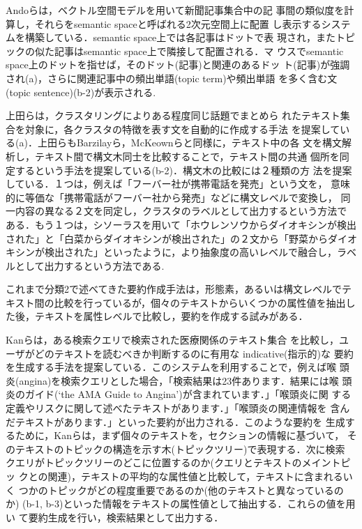 Andoら\cite{ando:00:a}は，ベクトル空間モデルを用いて新聞記事集合中の記
事間の類似度を計算し，それらをsemantic spaceと呼ばれる2次元空間上に配置
し表示するシステムを構築している．semantic space上では各記事はドットで表
現され，またトピックの似た記事はsemantic space上で隣接して配置される．マ
ウスでsemantic space上のドットを指せば，そのドット(記事)と関連のあるドッ
ト(記事)が強調され(a)，さらに関連記事中の頻出単語(topic term)や頻出単語
を多く含む文(topic sentence)(b-2)が表示される.

上田ら\cite{ueda:00:a}は，クラスタリングによりある程度同じ話題でまとめら
れたテキスト集合を対象に，各クラスタの特徴を表す文を自動的に作成する手法
を提案している(a)．上田らもBarzilayら，McKeownらと同様に，テキスト中の各
文を構文解析し，テキスト間で構文木同士を比較することで，テキスト間の共通
個所を同定するという手法を提案している(b-2)．構文木の比較には２種類の方
法を提案している．１つは，例えば「フーバー社が携帯電話を発売」という文を，
意味的に等価な「携帯電話がフーバー社から発売」などに構文レベルで変換し，
同一内容の異なる２文を同定し，クラスタのラベルとして出力するという方法で
ある．もう１つは，シソーラスを用いて「ホウレンソウからダイオキシンが検出
された」と「白菜からダイオキシンが検出された」の２文から「野菜からダイオ
キシンが検出された」といったように，より抽象度の高いレベルで融合し，ラベ
ルとして出力するという方法である.

これまで分類2で述べてきた要約作成手法は，形態素，あるいは構文レベルでテ
キスト間の比較を行っているが，個々のテキストからいくつかの属性値を抽出し
た後，テキストを属性レベルで比較し，要約を作成する試みがある．

Kanら\cite{kan:01:a}は，ある検索クエリで検索された医療関係のテキスト集合
を比較し，ユーザがどのテキストを読むべきか判断するのに有用な
indicative(指示的)な
要約を生成する手法を提案している．このシステムを利用することで，例えば喉
頭炎(angina)を検索クエリとした場合，「検索結果は23件あります．結果には喉
頭炎のガイド(`the AMA Guide to Angina')が含まれています．」「喉頭炎に関
する定義やリスクに関して述べたテキストがあります．」「喉頭炎の関連情報を
含んだテキストがあります．」といった要約が出力される．このような要約を
生成するために，Kanらは，まず個々のテキストを，セクションの情報に基づいて，
そのテキストのトピックの構造を示す木(トピックツリー)で表現する．次に検索
クエリがトピックツリーのどこに位置するのか(クエリとテキストのメイントピッ
クとの関連)，テキストの平均的な属性値と比較して，テキストに含まれるいく
つかのトピックがどの程度重要であるのか(他のテキストと異なっているのか)
(b-1, b-3)といった情報をテキストの属性値として抽出する．これらの値を用い
て要約生成を行い，検索結果として出力する．

